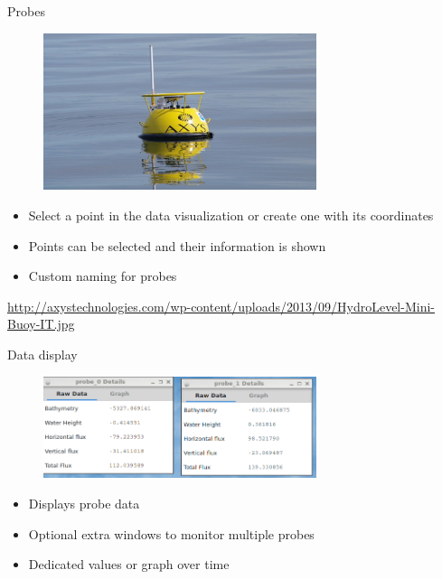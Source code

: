 \documentclass[shortpres,usenames,dvipsnames]{beamer}
\begin{document}
\begin{frame}[fragile]{Probes}
	\begin{figure}
		\includegraphics[clip, width=80mm]{img/Buoy.jpg}
	\end{figure}
	\begin{itemize}
		\item Select a point in the data visualization or create one with its coordinates
		\item Points can be selected and their information is shown
		\item Custom naming for probes
	\end{itemize}
	\vfill
	\flushleft
	{\fontsize{5}{5} \selectfont \url{http://axystechnologies.com/wp-content/uploads/2013/09/HydroLevel-Mini-Buoy-IT.jpg}}
\end{frame}

\begin{frame}[fragile]{Data display}
	\begin{figure}
		\includegraphics[clip, width=80mm]{img/datadisplay.png}
	\end{figure}
	\begin{itemize}
		\item Displays probe data
		\item Optional extra windows to monitor multiple probes
		\item Dedicated values or graph over time 
	\end{itemize}
\end{frame}
\end{document}
